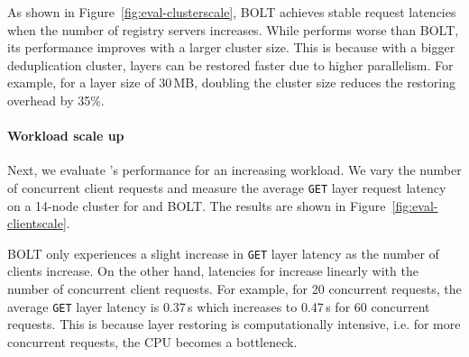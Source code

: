 As shown in Figure~\ref{fig:eval-clusterscale}, BOLT achieves stable request latencies when
the number of registry servers increases.
%
While \sysname performs worse than BOLT, its performance improves with a larger cluster size.
%
This is because with a bigger deduplication cluster, layers can be restored faster due to higher
parallelism.
%
For example, for a layer size of 30\,MB, doubling the cluster size reduces the restoring
overhead by 35\%.

\paragraph{Workload scale up}
%
Next, we evaluate \sysname{}'s performance for an increasing workload.
%
We vary the number of concurrent client requests and measure the average \texttt{GET} layer
request latency on a 14-node cluster for \sysname and BOLT.
%
The results are shown in Figure~\ref{fig:eval-clientscale}.

BOLT only experiences a slight increase in \texttt{GET} layer latency as the number of clients increase.
%
On the other hand, latencies for \sysname increase linearly with the number of concurrent client requests.
%
For example, for 20 concurrent requests, the average \texttt{GET} layer latency is 0.37\,s which
increases to 0.47\,s for 60 concurrent requests.
%
This is because layer restoring is computationally intensive, i.e. for more concurrent requests, the CPU
becomes a bottleneck.


